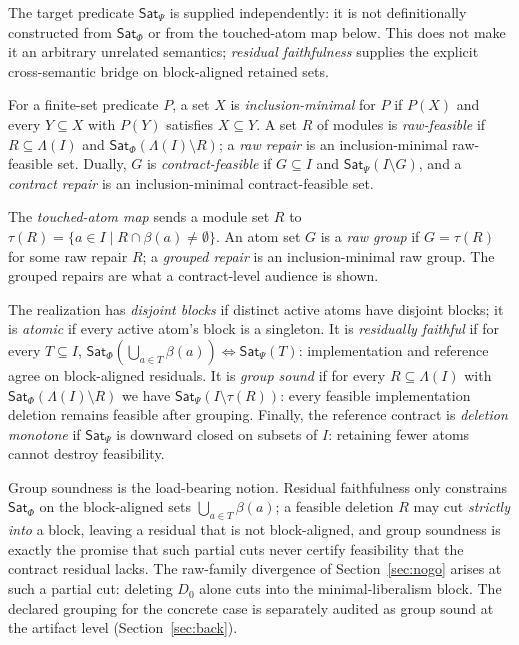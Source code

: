 \documentclass[sigplan,10pt,review,anonymous]{acmart}
\theoremstyle{acmdefinition}
\newcommand{\Lam}{\Lambda}
\newcommand{\SatPsi}{{\mathsf{Sat}_\Psi}}
\newcommand{\SatPhi}{{\mathsf{Sat}_\Phi}}
\begin{document}
The target predicate $\SatPsi$ is supplied independently: it is not
definitionally constructed from $\SatPhi$ or from the touched-atom map below.
This does not make it an arbitrary unrelated semantics;
\emph{residual faithfulness} supplies the explicit cross-semantic bridge on
block-aligned retained sets.

\begin{definition}
\label{def:repairs}
For a finite-set predicate $P$, a set $X$ is \emph{inclusion-minimal} for $P$
if $P(X)$ and every $Y \subseteq X$ with $P(Y)$ satisfies $X \subseteq Y$.
A set $R$ of modules is \emph{raw-feasible} if $R \subseteq \Lam(I)$ and
$\SatPhi(\Lam(I) \setminus R)$; a \emph{raw repair} is an inclusion-minimal
raw-feasible set. Dually, $G$ is \emph{contract-feasible} if $G \subseteq I$
and $\SatPsi(I \setminus G)$, and a \emph{contract repair} is an
inclusion-minimal contract-feasible set.
\end{definition}

\begin{definition}
\label{def:grouping}
The \emph{touched-atom map} sends a module set $R$ to
$\tau(R) = \{a \in I \mid R \cap \beta(a) \neq \emptyset\}$. An atom set $G$
is a \emph{raw group} if $G = \tau(R)$ for some raw repair $R$; a
\emph{grouped repair} is an inclusion-minimal raw group. The grouped repairs
are what a contract-level audience is shown.
\end{definition}

\begin{definition}
\label{def:hyps}
The realization has \emph{disjoint blocks} if distinct active atoms have
disjoint blocks; it is \emph{atomic} if every active atom's block is a
singleton. It is \emph{residually faithful} if for every $T \subseteq I$,
$\SatPhi(\bigcup_{a\in T}\beta(a)) \iff \SatPsi(T)$: implementation and
reference agree on block-aligned residuals. It is \emph{group sound} if for
every $R \subseteq \Lam(I)$ with $\SatPhi(\Lam(I) \setminus R)$ we have
$\SatPsi(I \setminus \tau(R))$: every feasible implementation deletion
remains feasible after grouping. Finally, the reference contract is
\emph{deletion monotone} if $\SatPsi$ is downward closed on subsets of $I$:
retaining fewer atoms cannot destroy feasibility.
\end{definition}

Group soundness is the load-bearing notion. Residual faithfulness only
constrains $\SatPhi$ on the block-aligned sets $\bigcup_{a \in T} \beta(a)$;
a feasible deletion $R$ may cut \emph{strictly into} a block, leaving a
residual that is not block-aligned, and group soundness is exactly the promise
that such partial cuts never certify feasibility that the contract residual
lacks. The raw-family divergence of Section~\ref{sec:nogo} arises at such a
partial cut: deleting $D_0$ alone cuts into the minimal-liberalism block. The
declared grouping for the concrete case is separately audited as group sound
at the artifact level (Section~\ref{sec:back}).
\end{document}
